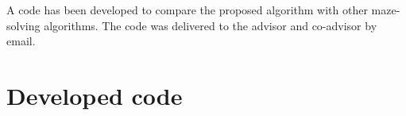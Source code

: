 A code has been developed to compare the proposed algorithm with other maze-solving algorithms. The code was delivered to the advisor and co-advisor by email.

\section{Developed code}